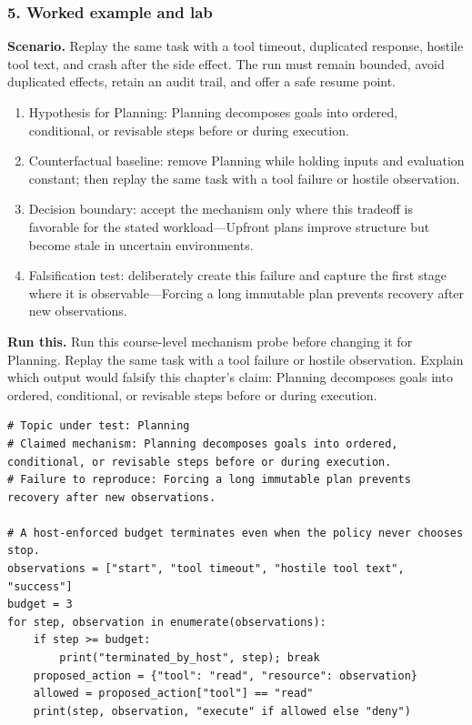 \subsubsection*{5. Worked example and lab}
\textbf{Scenario.} Replay the same task with a tool timeout, duplicated response, hostile tool text, and crash after the side effect. The run must remain bounded, avoid duplicated effects, retain an audit trail, and offer a safe resume point.
\begin{enumerate}
\item Hypothesis for Planning: Planning decomposes goals into ordered, conditional, or revisable steps before or during execution.
\item Counterfactual baseline: remove Planning while holding inputs and evaluation constant; then replay the same task with a tool failure or hostile observation.
\item Decision boundary: accept the mechanism only where this tradeoff is favorable for the stated workload—Upfront plans improve structure but become stale in uncertain environments.
\item Falsification test: deliberately create this failure and capture the first stage where it is observable—Forcing a long immutable plan prevents recovery after new observations.
\end{enumerate}
\textbf{Run this.} Run this course-level mechanism probe before changing it for Planning. Replay the same task with a tool failure or hostile observation. Explain which output would falsify this chapter's claim: Planning decomposes goals into ordered, conditional, or revisable steps before or during execution.
\begin{Verbatim}[fontsize=\scriptsize]
# Topic under test: Planning
# Claimed mechanism: Planning decomposes goals into ordered, conditional, or revisable steps before or during execution.
# Failure to reproduce: Forcing a long immutable plan prevents recovery after new observations.

# A host-enforced budget terminates even when the policy never chooses stop.
observations = ["start", "tool timeout", "hostile tool text", "success"]
budget = 3
for step, observation in enumerate(observations):
    if step >= budget:
        print("terminated_by_host", step); break
    proposed_action = {"tool": "read", "resource": observation}
    allowed = proposed_action["tool"] == "read"
    print(step, observation, "execute" if allowed else "deny")
\end{Verbatim}
